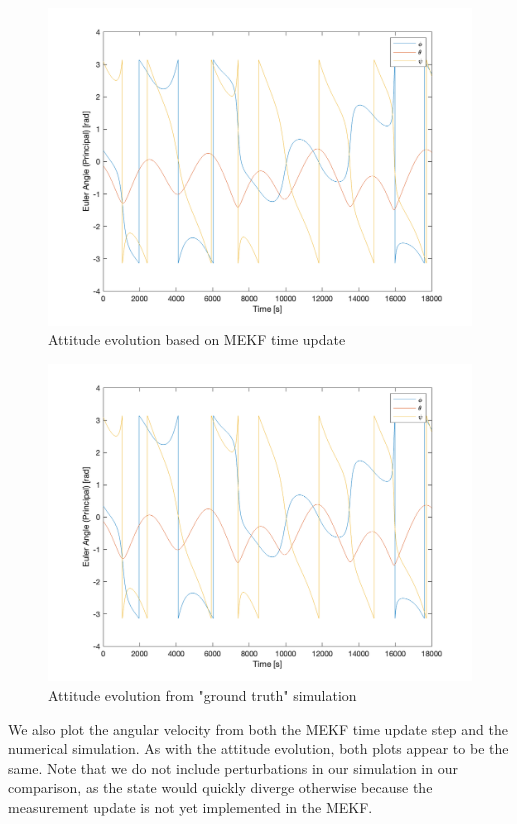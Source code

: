 \begin{figure}[H]
\centering
\includegraphics[scale=0.6]{Images/ps7_problem5a_angle_est.png}
\caption{Attitude evolution based on MEKF time update}
\label{fig:ps7_problem5a_angle_est}
\end{figure}

\begin{figure}[H]
\centering
\includegraphics[scale=0.6]{Images/ps7_problem5a_angle_sim.png}
\caption{Attitude evolution from "ground truth" simulation}
\label{fig:ps7_problem5a_angle_sim}
\end{figure}

We also plot the angular velocity from both the MEKF time update step and the numerical simulation. As with the attitude evolution, both plots appear to be the same. Note that we do not include perturbations in our simulation in our comparison, as the state would quickly diverge otherwise because the measurement update is not yet implemented in the MEKF.

